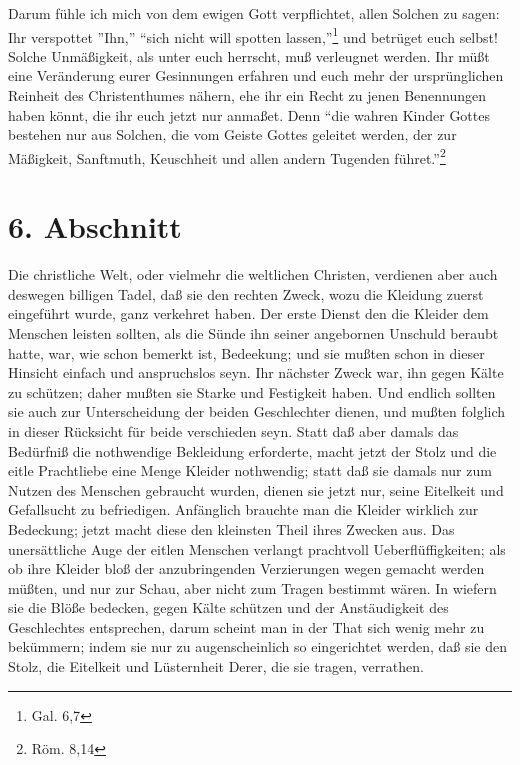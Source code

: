 \medskip

Darum fühle ich mich von dem ewigen Gott verpflichtet, allen Solchen zu sagen:
Ihr verspottet ''Ihn,'' "`sich nicht will spotten lassen,"'\footnote{Gal. 6,7}
und betrüget euch selbst! Solche Unmäßigkeit, als unter euch herrscht, muß
verleugnet werden. Ihr müßt eine Veränderung eurer Gesinnungen erfahren und euch
mehr der ursprünglichen Reinheit des Christenthumes nähern, ehe ihr ein Recht zu
jenen Benennungen haben könnt, die ihr euch jetzt nur anmaßet. Denn "`die wahren
Kinder Gottes bestehen nur aus Solchen, die vom Geiste Gottes geleitet werden,
der zur Mäßigkeit, Sanftmuth, Keuschheit und allen andern Tugenden
führet."'\footnote{Röm. 8,14}

\section{6. Abschnitt} \label{kap14_ab6}

Die christliche Welt, oder vielmehr die weltlichen Christen, verdienen aber auch
deswegen billigen Tadel, daß sie den rechten Zweck, wozu die Kleidung zuerst
eingeführt wurde, ganz verkehret haben. Der erste Dienst den die Kleider dem
Menschen leisten sollten, als die Sünde ihn seiner angebornen Unschuld beraubt
hatte, war, wie schon bemerkt ist, Bedeekung; und sie mußten schon in dieser
Hinsicht einfach und anspruchslos seyn. Ihr nächster Zweck war, ihn gegen Kälte
zu schützen; daher mußten sie Starke und Festigkeit haben. Und endlich sollten
sie auch zur Unterscheidung der beiden Geschlechter dienen, und mußten folglich
in dieser Rücksicht für beide verschieden seyn. Statt daß aber damals das
Bedürfniß die nothwendige Bekleidung erforderte, macht jetzt der Stolz und die
eitle Prachtliebe eine Menge Kleider nothwendig; statt daß sie damals nur zum
Nutzen des Menschen gebraucht wurden, dienen sie jetzt nur, seine Eitelkeit und
Gefallsucht zu befriedigen. Anfänglich brauchte man die Kleider wirklich zur
Bedeckung; jetzt macht diese den kleinsten Theil ihres Zwecken aus. Das
unersättliche Auge der eitlen Menschen verlangt prachtvoll Ueberflüffigkeiten;
als ob ihre Kleider bloß der anzubringenden Verzierungen wegen gemacht werden
müßten, und nur zur Schau, aber nicht zum Tragen bestimmt wären. In wiefern sie
die Blöße bedecken, gegen Kälte schützen und der Anstäudigkeit des Geschlechtes
entsprechen, darum scheint man in der That sich wenig mehr zu bekümmern; indem
sie nur zu augenscheinlich so eingerichtet werden, daß sie den Stolz, die
Eitelkeit und Lüsternheit Derer, die sie tragen, verrathen.

